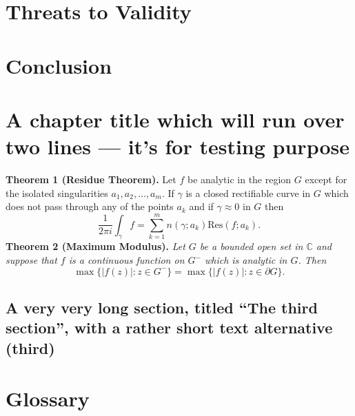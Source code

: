 \documentclass[12pt,mscthesis]{usiinfthesis}
\begin{document}
\chapter{Threats to Validity}

\chapter{Conclusion}

\chapter[Short title]{A chapter title which will run over two lines --- it's for
  testing purpose}


\textbf{Theorem 1 (Residue Theorem).}
Let $f$ be analytic in the region $G$ except for the isolated singularities $a_1,a_2,\ldots,a_m$. If $\gamma$ is a closed rectifiable curve in $G$ which does not pass through any of the points $a_k$ and if $\gamma\approx 0$ in $G$ then
\[
\frac{1}{2\pi i}\int_\gamma f = \sum_{k=1}^m n(\gamma;a_k) \text{Res}(f;a_k).
\]
\textbf{Theorem 2 (Maximum Modulus).}
\emph{Let $G$ be a bounded open set in $\mathbb{C}$ and suppose that $f$ is a continuous function on $G^-$ which is analytic in $G$. Then}
\[
\max\{|f(z)|:z\in G^-\}=\max \{|f(z)|:z\in \partial G \}.
\]

\section[third]{A very very long section, titled ``The third section'', with
  a rather  short text alternative (third)}



\nocite{*}

\appendix %



\backmatter

\chapter{Glossary} %

%
%



\end{document}
